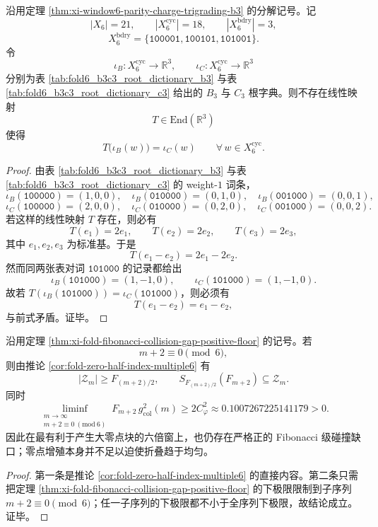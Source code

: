 \begin{theorem}\label{thm:xi-window6-b3c3-no-global-linear-unifier}
沿用定理 \ref{thm:xi-window6-parity-charge-trigrading-b3} 的分解记号。记
\[
|X_6|=21,\qquad |X_6^{\mathrm{cyc}}|=18,\qquad |X_6^{\mathrm{bdry}}|=3,
\]
\[
X_6^{\mathrm{bdry}}
=
\{\texttt{100001},\texttt{100101},\texttt{101001}\}.
\]
令
\[
\iota_B:X_6^{\mathrm{cyc}}\to \mathbb R^3,
\qquad
\iota_C:X_6^{\mathrm{cyc}}\to \mathbb R^3
\]
分别为表 \ref{tab:fold6_b3c3_root_dictionary_b3} 与表 \ref{tab:fold6_b3c3_root_dictionary_c3} 给出的 \(B_3\) 与 \(C_3\) 根字典。则不存在线性映射
\[
T\in \mathrm{End}(\mathbb R^3)
\]
使得
\[
T\bigl(\iota_B(w)\bigr)=\iota_C(w)
\qquad
\forall\,w\in X_6^{\mathrm{cyc}}.
\]
\end{theorem}
\begin{proof}
由表 \ref{tab:fold6_b3c3_root_dictionary_b3} 与表 \ref{tab:fold6_b3c3_root_dictionary_c3} 的 weight-\(1\) 词条，
\[
\iota_B(\texttt{100000})=(1,0,0),\quad
\iota_B(\texttt{010000})=(0,1,0),\quad
\iota_B(\texttt{001000})=(0,0,1),
\]
\[
\iota_C(\texttt{100000})=(2,0,0),\quad
\iota_C(\texttt{010000})=(0,2,0),\quad
\iota_C(\texttt{001000})=(0,0,2).
\]
若这样的线性映射 \(T\) 存在，则必有
\[
T(e_1)=2e_1,\qquad T(e_2)=2e_2,\qquad T(e_3)=2e_3,
\]
其中 \(e_1,e_2,e_3\) 为标准基。于是
\[
T(e_1-e_2)=2e_1-2e_2.
\]
然而同两张表对词 \(\texttt{101000}\) 的记录都给出
\[
\iota_B(\texttt{101000})=(1,-1,0),
\qquad
\iota_C(\texttt{101000})=(1,-1,0).
\]
故若 \(T(\iota_B(\texttt{101000}))=\iota_C(\texttt{101000})\)，则必须有
\[
T(e_1-e_2)=e_1-e_2,
\]
与前式矛盾。证毕。
\end{proof}





\begin{corollary}[六倍窗大零块与非消失碰撞缺口的共存]\label{cor:xi-window6-zero-block-and-collision-gap-coexistence}
沿用定理 \ref{thm:xi-fold-fibonacci-collision-gap-positive-floor} 的记号。若
\[
m+2\equiv 0\pmod 6,
\]
则由推论 \ref{cor:fold-zero-half-index-multiple6} 有
\[
\boxed{\;
|\mathcal Z_m|\ge F_{(m+2)/2},
\qquad
S_{F_{(m+2)/2}}(F_{m+2})\subseteq \mathcal Z_m.\;}
\]
同时
\[
\boxed{\;
\liminf_{\substack{m\to\infty\\ m+2\equiv 0\ (\mathrm{mod}\ 6)}}
F_{m+2}\,g_{\mathrm{col}}^2(m)
\ge
2C_\varphi^2
\approx 0.1007267225141179>0.\;}
\]
因此在最有利于产生大零点块的六倍窗上，也仍存在严格正的 Fibonacci 级碰撞缺口；零点增殖本身并不足以迫使折叠趋于均匀。
\end{corollary}
\begin{proof}
第一条是推论 \ref{cor:fold-zero-half-index-multiple6} 的直接内容。第二条只需把定理 \ref{thm:xi-fold-fibonacci-collision-gap-positive-floor} 的下极限限制到子序列 \(m+2\equiv 0\pmod 6\)；任一子序列的下极限都不小于全序列下极限，故结论成立。证毕。
\end{proof}

